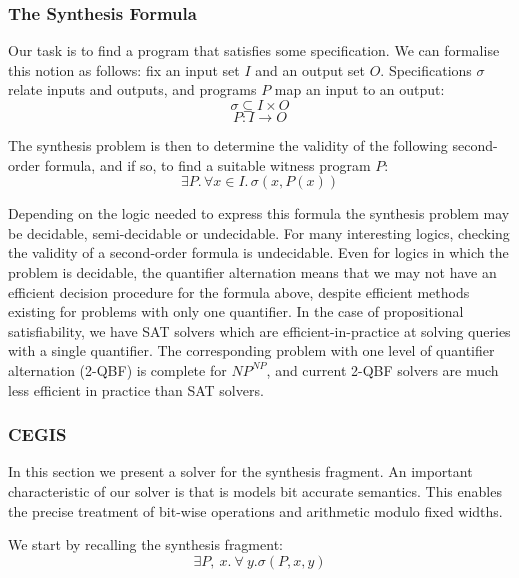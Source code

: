 \subsubsection{The Synthesis Formula}
\label{sec:abstract-formula}

Our task is to find a program that satisfies some specification.  We can formalise this
notion as follows: fix an input set $I$ and an output set $O$.  Specifications $\sigma$
relate inputs and outputs, and programs $P$ map an input to an output:
%
$$ \sigma \subseteq I \times O $$
$$ P : I \rightarrow O$$

The synthesis problem is then to determine the validity of the following
second-order formula, and if so, to find a suitable witness program $P$:
%
$$\exists P .\, \forall x \in I.\, \sigma(x, P(x))$$

Depending on the logic needed to express this formula the synthesis problem
may be decidable, semi-decidable or undecidable.  For many interesting
logics, checking the validity of a second-order formula is undecidable. 
Even for logics in which the problem is decidable, the quantifier
alternation means that we may not have an efficient decision procedure for
the formula above, despite efficient methods existing for problems
with only one quantifier.  In the case of propositional
satisfiability, we have SAT solvers which are efficient-in-practice at
solving queries with a single quantifier.  The corresponding problem with
one level of quantifier alternation (2-QBF) is complete for $NP^{NP}$, and
current 2-QBF solvers are much less efficient in practice than SAT solvers.

\subsubsection{CEGIS}

\fi

In this section we present a solver for the synthesis fragment. An
important characteristic of our solver is that is models bit accurate
semantics. This enables the precise treatment of bit-wise operations and
arithmetic modulo fixed widths.
 
We start by recalling the synthesis fragment:
 \[
  \exists P,~ x . ~\forall~ y . \sigma(P, x, y)
 \]

